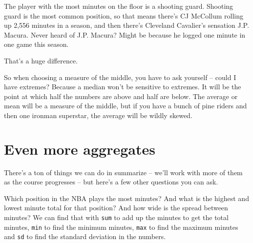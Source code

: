 \documentclass[
]{book}
\newenvironment{Shaded}{\begin{snugshade}}{\end{snugshade}}
\newcommand{\DataTypeTok}[1]{\textcolor[rgb]{0.13,0.29,0.53}{#1}}
\newcommand{\KeywordTok}[1]{\textcolor[rgb]{0.13,0.29,0.53}{\textbf{#1}}}
\newcommand{\NormalTok}[1]{#1}
\newcommand{\OperatorTok}[1]{\textcolor[rgb]{0.81,0.36,0.00}{\textbf{#1}}}
\newcommand{\StringTok}[1]{\textcolor[rgb]{0.31,0.60,0.02}{#1}}
\begin{document}
The player with the most minutes on the floor is a shooting guard. Shooting guard is the most common position, so that means there's CJ McCollum rolling up 2,556 minutes in a season, and then there's Cleveland Cavalier's sensation J.P. Macura. Never heard of J.P. Macura? Might be because he logged one minute in one game this season.

That's a huge difference.

So when choosing a measure of the middle, you have to ask yourself -- could I have extremes? Because a median won't be sensitive to extremes. It will be the point at which half the numbers are above and half are below. The average or mean will be a measure of the middle, but if you have a bunch of pine riders and then one ironman superstar, the average will be wildly skewed.

\hypertarget{even-more-aggregates}{%
\section{Even more aggregates}\label{even-more-aggregates}}

There's a ton of things we can do in summarize -- we'll work with more of them as the course progresses -- but here's a few other questions you can ask.

Which position in the NBA plays the most minutes? And what is the highest and lowest minute total for that position? And how wide is the spread between minutes? We can find that with \texttt{sum} to add up the minutes to get the total minutes, \texttt{min} to find the minimum minutes, \texttt{max} to find the maximum minutes and \texttt{sd} to find the standard deviation in the numbers.

\begin{Shaded}
\end{Shaded}
\end{document}
